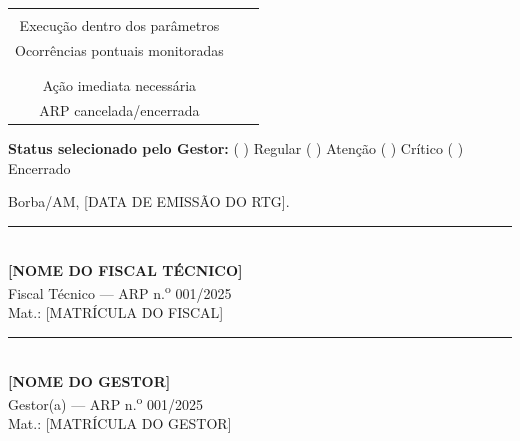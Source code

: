 \documentclass[12pt,a4paper]{article}
\newcommand{\arpRef}{ARP n.\textsuperscript{o} 001/2025}
\newcommand{\rtgData}{[DATA DE EMISSÃO DO RTG]}
\newcommand{\gestorNome}{[NOME DO GESTOR]}
\newcommand{\gestorMat}{[MATRÍCULA DO GESTOR]}
\newcommand{\fiscalNome}{[NOME DO FISCAL TÉCNICO]}
\newcommand{\fiscalMat}{[MATRÍCULA DO FISCAL]}
\begin{document}
\begin{center}
  \begin{tabular}{ccc}
    \begin{tcolorbox}[colback=okgreen,colframe=okbdr,arc=5pt,
      width=4.0cm,halign=center]
      \small\bfseries\color{okbdr} REGULAR\\
      \tiny Execução dentro dos parâmetros
    \end{tcolorbox}
    & \quad &
    \begin{tcolorbox}[colback=warnyelw,colframe=warnybdr,arc=5pt,
      width=4.0cm,halign=center]
      \small\bfseries\color{warnybdr} ATENÇÃO\\
      \tiny Ocorrências pontuais monitoradas
    \end{tcolorbox}
    \\ \\
    \begin{tcolorbox}[colback=failred,colframe=failbdr,arc=5pt,
      width=4.0cm,halign=center]
      \small\bfseries\color{failbdr} CRÍTICO\\
      \tiny Ação imediata necessária
    \end{tcolorbox}
    & \quad &
    \begin{tcolorbox}[colback=ltblue,colframe=navy,arc=5pt,
      width=4.0cm,halign=center]
      \small\bfseries\color{navy} ENCERRADO\\
      \tiny ARP cancelada/encerrada
    \end{tcolorbox}
  \end{tabular}
\end{center}

\vspace{0.3cm}
\noindent \textbf{Status selecionado pelo Gestor:}
( ) Regular \quad ( ) Atenção \quad ( ) Crítico \quad ( ) Encerrado

\vspace{0.8cm}
\noindent\hfill Borba/AM, \rtgData.

\vspace{1.0cm}
\begin{minipage}{0.47\linewidth}
  \begin{center}
    \rule{7.5cm}{0.5pt}\\[3pt]
    \textbf{\fiscalNome}\\
    \small Fiscal Técnico --- \arpRef\\
    \small Mat.: \fiscalMat
  \end{center}
\end{minipage}
\hfill
\begin{minipage}{0.47\linewidth}
  \begin{center}
    \rule{7.5cm}{0.5pt}\\[3pt]
    \textbf{\gestorNome}\\
    \small Gestor(a) --- \arpRef\\
    \small Mat.: \gestorMat
  \end{center}
\end{minipage}
\end{document}
